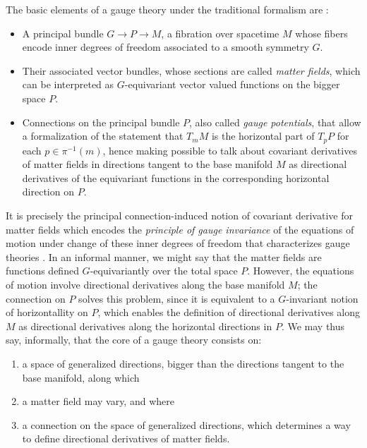 The basic elements of a gauge theory under the traditional formalism are \cite{Naber}:
    \begin{itemize}
        
    \item A principal bundle $G \to P \to M$, a fibration over spacetime $M$ whose fibers encode inner degrees of freedom associated to a smooth symmetry $G$.
    
    \item Their associated vector bundles, whose sections are called \emph{matter fields}, which can be interpreted as $G$-equivariant vector valued functions on the bigger space $P$.
    
    \item Connections on the principal bundle $P$, also called \emph{gauge potentials}, that allow a formalization of the statement that $T_m M$ is the horizontal part of $T_p P$ for each $p \in \pi^{-1}(m)$, hence making possible to talk about covariant derivatives of matter fields in directions tangent to the base manifold $M$ as directional derivatives of the equivariant functions in the corresponding horizontal direction on $P$.
    
    \end{itemize}
It is precisely the principal connection-induced notion of covariant derivative for matter fields which encodes the \emph{principle of gauge invariance} of the equations of motion under change of these inner degrees of freedom that characterizes gauge theories \cite{Bleecker1982}. 
In an informal manner, we might say that the matter fields are functions defined $G$-equivariantly over the total space $P$. However, the equations of motion involve directional derivatives along the base manifold $M$; the connection on $P$ solves this problem, since it is equivalent to a $G$-invariant notion of horizontallity on $P$, %
 which enables the definition of directional derivatives along $M$ as directional derivatives along the horizontal directions in $P$.
We may thus say, informally, that the core of a gauge theory consists on:
\begin{enumerate}
    \item a space of generalized directions, bigger than the directions tangent to the base manifold, along which 
    
    \item a matter field may vary, and where 
    
    \item a connection on the space of generalized directions, which determines a way to define directional derivatives of matter fields.
\end{enumerate} 
